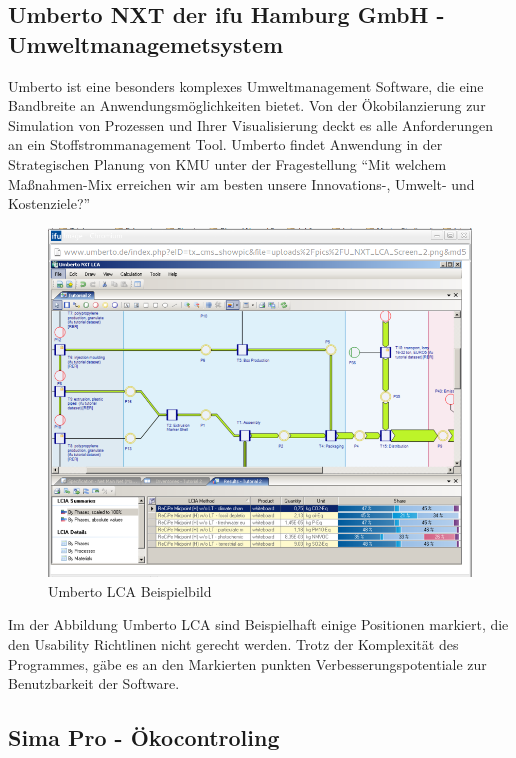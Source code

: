 \documentclass[a4paper, 12pt, twoside, BCOR=20mm, DIV=calc, abstracton, parskip=half*, toc=bibliography, toc=listof, headsepline, footsepline, headings=small, numbers=enddot]{scrreprt}
\begin{document}
\subsection{Umberto NXT der ifu Hamburg GmbH - Umweltmanagemetsystem} 

	Umberto ist eine besonders komplexes Umweltmanagement Software, die eine Bandbreite an Anwendungsmöglichkeiten bietet. Von der Ökobilanzierung zur Simulation von Prozessen und Ihrer Visualisierung deckt es alle Anforderungen an ein Stoffstrommanagement Tool. %
	Umberto findet Anwendung in der Strategischen Planung von \ac{KMU} unter der Fragestellung "`Mit welchem Maßnahmen-Mix erreichen wir am besten unsere Innovations-, Umwelt- und Kostenziele?"'
		
	\begin{figure}
	\includegraphics[width=\textwidth]{Bild/Umberto_NXT_LCA.png}
		\caption{Umberto LCA Beispielbild} 
	\end{figure}
	
	Im der Abbildung Umberto LCA sind Beispielhaft einige Positionen markiert, die den Usability Richtlinen nicht gerecht werden. 
	Trotz der Komplexität des Programmes, gäbe es an den Markierten punkten Verbesserungspotentiale zur Benutzbarkeit der Software. 
	
\subsection{Sima Pro - Ökocontroling}
\end{document}
